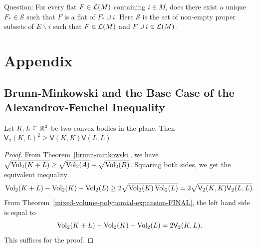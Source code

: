 \documentclass{puthesis-UG}
\begin{document}
Question: For every flat $F \in \mathcal{L}(M)$ containing $i \in M$, does there exist a unique $F_* \in \mathcal{S}$ such that $F$ is a flat of $F_* \cup i$. Here $\mathcal{S}$ is the set of non-empty proper subsets of $E \backslash i$ such that $F \in \mathcal{L}(M)$ and $F \cup i \in \mathcal{L}(M)$. 

\chapter{Appendix}

\section{Brunn-Minkowski and the Base Case of the Alexandrov-Fenchel Inequality}

\begin{prop} \label{base-case-for-AF-inequality}
	Let $K, L \subseteq \mathbb{R}^2$ be two convex bodies in the plane. Then $\mathsf{V}_2(K, L)^2 \geq \mathsf{V}(K, K) \mathsf{V}(L, L)$. 
\end{prop}

\begin{proof}
	From Theorem~\ref{brunn-minkowski}, we have $\sqrt{\operatorname{Vol}_2(K + L)} \geq \sqrt{\operatorname{Vol}_2(A)} + \sqrt{\operatorname{Vol}_2(B)}$. Squaring both sides, we get the equivalent inequality
	\[	
		\operatorname{Vol}_2(K+L) - \operatorname{Vol}_2(K) - \operatorname{Vol}_2(L) \geq 2 \sqrt{\operatorname{Vol}_2(K) \operatorname{Vol}_2(L)} = 2 \sqrt{\mathsf{V}_2(K, K) \mathsf{V}_2(L, L)}.
	\]
	From Theorem~\ref{mixed-volume-polynomial-expansion-FINAL}, the left hand side is equal to 
	\[		
		\operatorname{Vol}_2(K+L) - \operatorname{Vol}_2(K) - \operatorname{Vol}_2(L) = 2 \mathsf{V}_2(K, L).
	\]
	This suffices for the proof. 
\end{proof}



\end{document}
